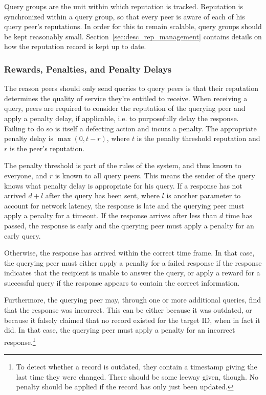 Query groups are the unit within which reputation is tracked. Reputation is
synchronized within a query group, so that every peer is aware of each of his
query peer's reputations. In order for this to remain scalable, query groups
should be kept reasonably small. Section~\ref{sec:desc_rep_management} contains
details on how the reputation record is kept up to date.

\subsubsection{Rewards, Penalties, and Penalty Delays}
The reason peers should only send queries to query peers is that their
reputation determines the quality of service they're entitled to receive. When
receiving a query, peers are required to consider the reputation of the querying
peer and apply a penalty delay, if applicable, i.e. to purposefully delay the
response. Failing to do so is itself a defecting action and incurs a penalty.
The appropriate penalty delay is $\max(0, t - r)$, where $t$ is the penalty
threshold reputation and $r$ is the peer's reputation.

The penalty threshold is part of the rules of the system, and thus known to
everyone, and $r$ is known to all query peers. This means the sender of the
query knows what penalty delay is appropriate for his query. If a response has
not arrived $d + l$ after the query has been sent, where $l$ is another
parameter to account for network latency, the response is late and the querying
peer must apply a penalty for a timeout. If the response arrives after less than
$d$ time has passed, the response is early and the querying peer must apply a
penalty for an early query.

Otherwise, the response has arrived within the correct time frame. In that case,
the querying peer must either apply a penalty for a failed response if the
response indicates that the recipient is unable to answer the query, or apply a
reward for a successful query if the response appears to contain the correct
information.

Furthermore, the querying peer may, through one or more additional queries, find
that the response was incorrect. This can be either because it was outdated, or
because it falsely claimed that no record existed for the target ID, when in
fact it did. In that case, the querying peer must apply a penalty for an
incorrect response.\footnote{To detect whether a record is outdated, they
contain a timestamp giving the last time they were changed. There should be some
leeway given, though. No penalty should be applied if the record has only just
been updated.}

